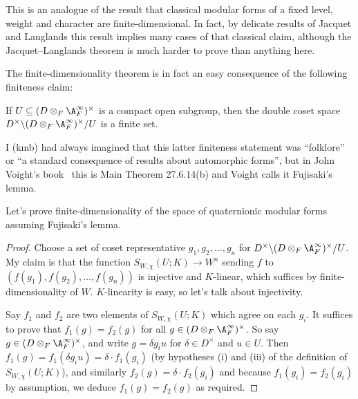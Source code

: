 This is an analogue of the result that classical modular forms of a fixed
level, weight and character are finite-dimensional. In fact, by delicate results
of Jacquet and Langlands this result implies many cases of that classical claim,
although the Jacquet--Langlands theorem is much harder to prove than anything
here.

The finite-dimensionality theorem is in fact an easy consequence of the following finiteness claim:
\begin{theorem}
  \label{TotallyDefiniteQuaternionAlgebra.finiteDoubleCoset}
  If $U\subseteq (D\otimes_F\A_F^\infty)^\times$ is a compact open subgroup,
  then the double coset space $D^\times\backslash(D\otimes_F\A_F^\infty)^\times/U$ is a
  finite set.
\end{theorem}

I (kmb) had always imagined that this latter finiteness statement was ``folklore'' or
``a standard consequence of results about automorphic forms'', but in John Voight's
book~\cite{voight} this is Main Theorem 27.6.14(b) and Voight calls it Fujisaki’s lemma.

Let's prove finite-dimensionality of the space of quaternionic modular forms
assuming Fujisaki's lemma.
\begin{proof}
  Choose a set of coset representative $g_1,g_2,\ldots,g_n$ for
  $D^\times\backslash(D\otimes_F\A_F^\infty)^\times/U$. My claim is that
  the function $S_{W,\chi}(U;K)\to W^n$ sending $f$ to $(f(g_1),f(g_2),\ldots,f(g_n))$
  is injective and $K$-linear, which suffices by finite-dimensionality of $W$.
  $K$-linearity is easy, so let's talk about injectivity.

  Say $f_1$ and $f_2$ are two elements of $S_{W,\chi}(U;K)$ which agree on
  each $g_i$. It suffices to prove that $f_1(g)=f_2(g)$ for all
  $g\in(D\otimes_F\A_F^\infty)^\times$. So say $g\in(D\otimes_F\A_F^\infty)^\times$,
  and write $g=\delta g_iu$ for $\delta \in D^\times$ and $u\in U$.
  Then $f_1(g)=f_1(\delta g_iu)=\delta\cdot f_1(g_i)$ (by hypotheses (i) and (iii)
  of the definition of $S_{W,\chi}(U;K)$), and similarly $f_2(g)=\delta\cdot f_2(g_i)$
  and because $f_1(g_i)=f_2(g_i)$ by assumption, we deduce $f_1(g)=f_2(g)$ as required.
\end{proof}
